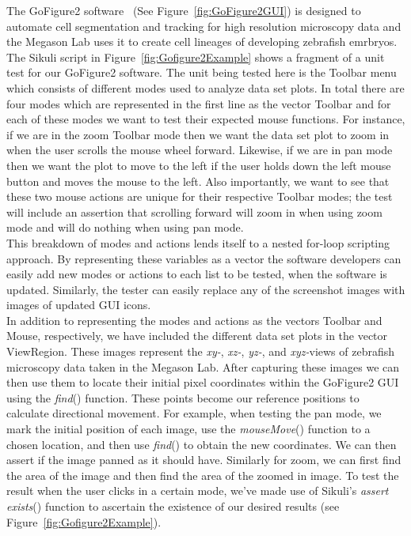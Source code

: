 \documentclass{InsightArticle}
\begin{document}
The GoFigure2 software~\cite{GoFigure2:Website} (See Figure~\ref{fig:GoFigure2GUI}) is designed to automate 
cell segmentation and tracking for high resolution microscopy data and the Megason Lab uses it to
create cell lineages of developing zebrafish emrbryos. The Sikuli script in Figure~\ref{fig:Gofigure2Example} shows a fragment of a
unit test for our GoFigure2 software.   The unit being
tested here is the Toolbar menu which consists of different modes used to
analyze data set plots. In total there are four modes which are represented in
the first line as the vector Toolbar and for each of these modes we want to test
their expected mouse functions. For instance, if we are in the zoom Toolbar
mode then we want the data set plot to zoom in when the user scrolls the mouse
wheel forward. Likewise, if we are in pan mode then we want the plot to move to
the left if the user holds down the left mouse button and moves the mouse to the
left.  Also importantly, we want to see that these two mouse actions are unique
for their respective Toolbar modes; the test will include an assertion that
scrolling forward will zoom in when using zoom mode and will do nothing when
using pan mode.\\

This breakdown of modes and actions lends itself to a nested for-loop scripting
approach. By representing these variables as a vector the software developers
can easily add new modes or actions to each list to be tested, when the software
is updated. Similarly, the tester can easily replace any of the screenshot
images with images of updated GUI icons.\\  

In addition to representing the modes and actions as the vectors Toolbar and
Mouse, respectively, we have included the different data set plots in the
vector ViewRegion. These images represent the \emph{xy-}, \emph{xz-},
\emph{yz-}, and \emph{xyz-}views of zebrafish microscopy data taken in the
Megason Lab. After capturing these images we can then use them to locate their
initial pixel coordinates within the GoFigure2 GUI using the \emph{find}()
function. These points become our reference positions to calculate directional
movement.  For example, when testing the pan mode, we mark the initial position
of each image, use the \emph{mouseMove}() function to a chosen location, and
then use \emph{find}() to obtain the new coordinates. We can then assert if the
image panned as it should have. Similarly for zoom, we can first find the area
of the image and then find the area of the zoomed in image.  To test the result
when the user clicks in a certain mode, we've made use of Sikuli's \emph{assert
exists}() function to ascertain the existence of our desired results (see
Figure~\ref{fig:Gofigure2Example}).\\
\end{document}
